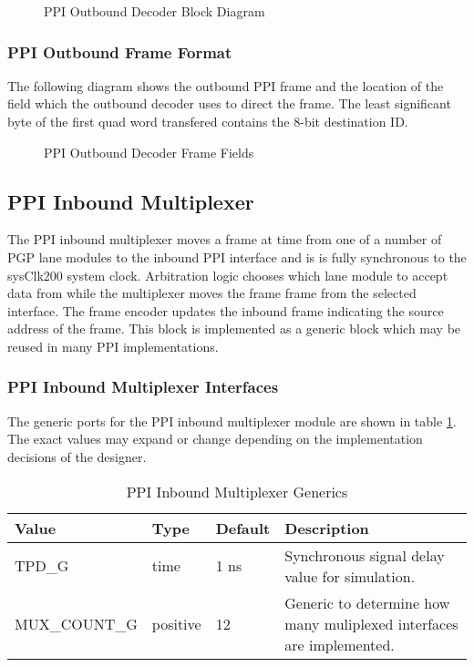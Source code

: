 \documentclass[11pt]{article}
\begin{document}
\begin{figure}[H]
   \centering
   \caption{PPI Outbound Decoder Block Diagram}
   \label{fig:ppi_ob_dec_block}
\end{figure}

\subsubsection{PPI Outbound Frame Format}

The following diagram shows the outbound PPI frame and the location of the field which the outbound decoder uses to direct the frame. 
The least significant byte of the first quad word transfered contains the 8-bit destination ID. 

\begin{figure}[H]
   \centering
   \caption{PPI Outbound Decoder Frame Fields}
   \label{fig:ppi_ob_frame_fields}
\end{figure}

\subsection{PPI Inbound Multiplexer}
\label{subsec:ppi_ib_mux}

The PPI inbound multiplexer moves a frame at time from one of a number of PGP lane modules to the inbound PPI interface and is
is fully synchronous to the sysClk200 system clock. Arbitration logic chooses which lane module to accept data from while the
multiplexer moves the frame frame from the selected interface. The frame encoder updates the inbound frame indicating the source 
address of the frame. This block is implemented as a generic block which may be reused in many PPI implementations.

\subsubsection{PPI Inbound Multiplexer Interfaces}

The generic ports for the PPI inbound multiplexer module are shown in table \ref{tab:ppi_ib_mux_generics}. 
The exact values may expand or change depending on the implementation decisions  of the designer. 

\begin{table}[H]
\small
\centering
   \begin{tabular}{| l | l | l | l | }
      \hline \textbf{Value} & \textbf{Type} & \textbf{Default} & \textbf{Description} \\
      \hline TPD\_G                  & time    & 1 ns  & Synchronous signal delay value for simulation.       \\
      \hline MUX\_COUNT\_G     & positive & 12    & Generic to determine how many muliplexed interfaces are implemented.\\
      \hline
   \end{tabular}
   \caption{PPI Inbound Multiplexer Generics}
   \label{tab:ppi_ib_mux_generics}
\end{table}
\end{document}
